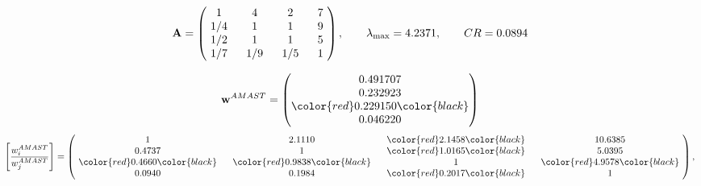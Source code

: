 \begin{example}
\begin{equation*}
\mathbf{A} =
\begin{pmatrix}
$\,\,$ 1 $\,\,$ & $\,\,$4$\,\,$ & $\,\,$2$\,\,$ & $\,\,$7 $\,\,$ \\
$\,\,$ 1/4$\,\,$ & $\,\,$ 1 $\,\,$ & $\,\,$1$\,\,$ & $\,\,$9 $\,\,$ \\
$\,\,$ 1/2$\,\,$ & $\,\,$ 1 $\,\,$ & $\,\,$ 1 $\,\,$ & $\,\,$5 $\,\,$ \\
$\,\,$ 1/7$\,\,$ & $\,\,$ 1/9$\,\,$ & $\,\,$ 1/5$\,\,$ & $\,\,$ 1  $\,\,$ \\
\end{pmatrix},
\qquad
\lambda_{\max} =
4.2371,
\qquad
CR = 0.0894
\end{equation*}

\begin{equation*}
\mathbf{w}^{AMAST} =
\begin{pmatrix}
0.491707\\
0.232923\\
\color{red} 0.229150\color{black} \\
0.046220
\end{pmatrix}\end{equation*}
\begin{equation*}
\left[ \frac{{w}^{AMAST}_i}{{w}^{AMAST}_j} \right] =
\begin{pmatrix}
$\,\,$ 1 $\,\,$ & $\,\,$2.1110$\,\,$ & $\,\,$\color{red} 2.1458\color{black} $\,\,$ & $\,\,$10.6385$\,\,$ \\
$\,\,$0.4737$\,\,$ & $\,\,$ 1 $\,\,$ & $\,\,$\color{red} 1.0165\color{black} $\,\,$ & $\,\,$5.0395  $\,\,$ \\
$\,\,$\color{red} 0.4660\color{black} $\,\,$ & $\,\,$\color{red} 0.9838\color{black} $\,\,$ & $\,\,$ 1 $\,\,$ & $\,\,$\color{red} 4.9578\color{black}  $\,\,$ \\
$\,\,$0.0940$\,\,$ & $\,\,$0.1984$\,\,$ & $\,\,$\color{red} 0.2017\color{black} $\,\,$ & $\,\,$ 1  $\,\,$ \\
\end{pmatrix},
\end{equation*}


\end{example}

